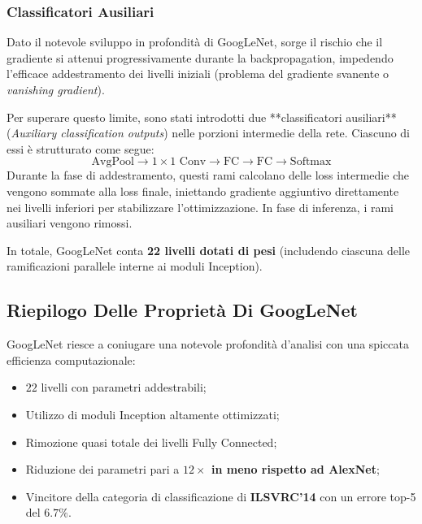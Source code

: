 ﻿\documentclass[11pt, a4paper]{article}
\begin{document}
\subsubsection{Classificatori Ausiliari}

Dato il notevole sviluppo in profondità di GoogLeNet, sorge il rischio che il gradiente si attenui progressivamente durante la backpropagation, impedendo l'efficace addestramento dei livelli iniziali (problema del gradiente svanente o \emph{vanishing gradient}).

Per superare questo limite, sono stati introdotti due **classificatori ausiliari** (\emph{Auxiliary classification outputs}) nelle porzioni intermedie della rete. Ciascuno di essi è strutturato come segue:
\[ \text{AvgPool} \rightarrow 1\times1 \text{ Conv} \rightarrow \text{FC} \rightarrow \text{FC} \rightarrow \text{Softmax} \]
Durante la fase di addestramento, questi rami calcolano delle loss intermedie che vengono sommate alla loss finale, iniettando gradiente aggiuntivo direttamente nei livelli inferiori per stabilizzare l'ottimizzazione. In fase di inferenza, i rami ausiliari vengono rimossi.


In totale, GoogLeNet conta \textbf{22 livelli dotati di pesi} (includendo ciascuna delle ramificazioni parallele interne ai moduli Inception).


\subsection{Riepilogo Delle Proprietà Di GoogLeNet}

GoogLeNet riesce a coniugare una notevole profondità d'analisi con una spiccata efficienza computazionale:
\begin{itemize}
    \item $22$ livelli con parametri addestrabili;
    \item Utilizzo di moduli Inception altamente ottimizzati;
    \item Rimozione quasi totale dei livelli Fully Connected;
    \item Riduzione dei parametri pari a \textbf{$12\times$ in meno rispetto ad AlexNet};
    \item Vincitore della categoria di classificazione di \textbf{ILSVRC'14} con un errore top-5 del \textbf{$6.7\%$}.
\end{itemize}
\end{document}
